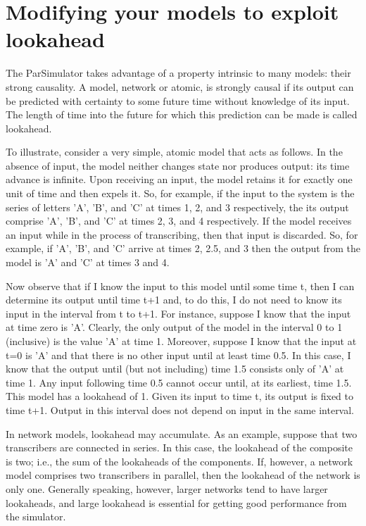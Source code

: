 \section{Modifying your models to exploit lookahead}
The ParSimulator takes advantage of a property intrinsic to many models: their strong causality. A model, network or atomic, is strongly causal if its output can be predicted with certainty to some future time without knowledge of its input. The length of time into the future for which this prediction can be made is called lookahead.

To illustrate, consider a very simple, atomic model that acts as follows. In the absence of input, the model neither changes state nor produces output: its time advance is infinite. Upon receiving an input, the model retains it for exactly one unit of time and then expels it. So, for example, if the input to the system is the series of letters 'A', 'B', and 'C' at times 1, 2, and 3 respectively, the its output comprise 'A', 'B', and 'C' at times 2, 3, and 4 respectively. If the model receives an input while in the process of transcribing, then that input is discarded. So, for example, if 'A', 'B', and 'C' arrive at times 2, 2.5, and 3 then the output from the model is 'A' and 'C' at times 3 and 4.

Now observe that if I know the input to this model until some time t, then I can determine its output until time t+1 and, to do this, I do not need to know its input in the interval from t to t+1. For instance, suppose I know that the input at time zero is 'A'. Clearly, the only output of the model in the interval 0 to 1 (inclusive) is the value 'A' at time 1. Moreover, suppose I know that the input at t=0 is 'A' and that there is no other input until at least time 0.5. In this case, I know that the output until (but not including) time 1.5 consists only of 'A' at time 1. Any input following time 0.5 cannot occur until, at its earliest, time 1.5. This model has a lookahead of 1. Given its input to time t, its output is fixed to time t+1. Output in this interval does not depend on input in the same interval.

In network models, lookahead may accumulate. As an example, suppose that two transcribers are connected in series. In this case, the lookahead of the composite is two; i.e., the sum of the lookaheads of the components. If, however, a network model comprises two transcribers in parallel, then the lookahead of the network is only one. Generally speaking, however, larger networks tend to have larger lookaheads, and large lookahead is essential for getting good performance from the simulator.

